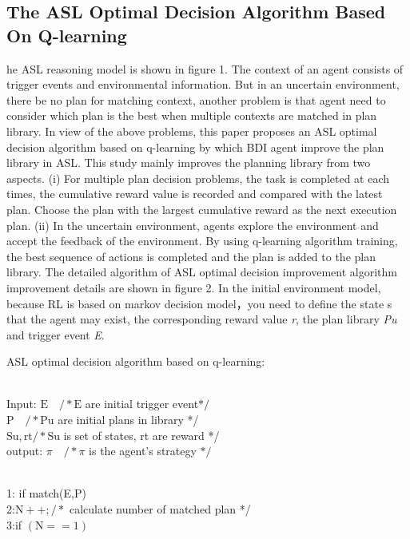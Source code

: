 \documentclass{article}
\begin{document}
\begin{multicols}{2}
\section{The ASL Optimal Decision Algorithm Based On
Q-learning}
he ASL reasoning model is shown in figure 1. The context of an
agent consists of trigger events and environmental information.
But in an uncertain environment, there be no plan for matching
context, another problem is that agent need to consider which plan
is the best when multiple contexts are matched in plan library. In
view of the above problems, this paper proposes an ASL optimal
decision algorithm based on q-learning by which BDI agent
improve the plan library in ASL. This study mainly improves the
planning library from two aspects. (i) For multiple plan decision
problems, the task is completed at each times, the cumulative
reward value is recorded and compared with the latest plan.
Choose the plan with the largest cumulative reward as the next
execution plan. (ii) In the uncertain environment, agents explore
the environment and accept the feedback of the environment. By
using q-learning algorithm training, the best sequence of actions is
completed and the plan is added to the plan library.
The detailed algorithm of ASL optimal decision improvement
algorithm improvement details are shown in figure 2. In the initial
environment model, because RL is based on markov decision
model，you need to define the state s that the agent may exist, the
corresponding reward value \textit{r}, the plan library \textit{Pu} and trigger
event \textit{E}.\\
ASL optimal decision algorithm based on q-learning:\\
 \\
Input: $\mathrm{E} \quad / * \mathrm{E}$ are initial trigger event$* /$ \\
$\mathrm{P} \quad / * \mathrm{Pu}$ are initial plans in library */ \\
$\mathrm{Su}, \mathrm{rt} / * \mathrm{Su}$ is set of states, rt are reward */\\
output: $\pi \quad / * \pi$ is the agent's strategy $* /$\\
\\
1: if match(E,P) \\
2:$\mathrm{N}++; / *$ calculate number of matched plan */ \\
3:if $(\mathrm{N}==1)$ 
\end{multicols}
\end{document}
